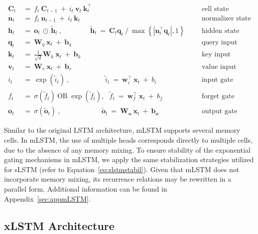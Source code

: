\begin{align}
\label{eq:mlstm_recurrent_begin}
\mathbf{C}_t \ &= \  f_t \ \mathbf{C}_{t-1} \ + \ 
  i_t \ \mathbf{v}_t \ \mathbf{k}_t^\top & &  &\text{cell state} \\
\mathbf{n}_t \ &= \  f_t \ \mathbf{n}_{t-1} \ + \ 
  i_t \ \mathbf{k}_t & &  &\text{normalizer state} \\
\mathbf{h}_t  \ &= \ \mathbf{o}_t \ \odot \ \tilde{\mathbf{h}}_t
\ , \qquad \qquad 
\tilde{\mathbf{h}}_t \ = \   \mathbf{C}_t \mathbf{q}_t \ / \ 
  \max \left\{ |\mathbf{n}_t^\top \mathbf{q}_t|, 1 \right\} 
   &&&\text{hidden state} \\
\mathbf{q}_t \ &= \ \mathbf{W}_q \ \mathbf{x}_t \ + \ \mathbf{b}_q  & &  &\text{query input} \\
\mathbf{k}_t \ &= \ \frac{1}{\sqrt{d}} \mathbf{W}_k \ \mathbf{x}_t \ + \ \mathbf{b}_k  & &  &\text{key input} \\
\mathbf{v}_t \ &= \ \mathbf{W}_v \ \mathbf{x}_t \ + \ \mathbf{b}_v  & &  &\text{value input} \\
i_t \ &= \ \!\exp \!  \! \left( \tilde{i}_t  \right) \ , 
 \qquad \qquad \ \ \ \ \,
  \tilde{i}_t \ = \ \mathbf{w}^\top_{i} \ \mathbf{x}_t \ + \  b_{i} \ \ \ 
  &&&\text{input gate} \\
f_t \ &= \ \sigma \!  \left(  \tilde{f}_t \right) \ \text{OR} \ \!\exp \!  \! \left(  \tilde{f}_t \right) , \ \ \: \!
\tilde{f}_t \ = \ \mathbf{w}^\top_{f} \ \mathbf{x}_t  \ + \
  b_{f}
  &&& \text{forget gate} \\
\label{eq:mlstm_recurrent_end}
\mathbf{o}_t \ &= \ \sigma \left( \tilde{\mathbf{o}}_t \right) \ , \qquad \qquad \quad \ \ \ \,
  \tilde{\mathbf{o}}_t  \ = \ \mathbf{W}_{\mathbf{o}} \ \mathbf{x}_t \ + \
  \mathbf{b}_{\mathbf{o}}
  &&&\text{output gate} 
\end{align}

Similar to the original LSTM architecture, mLSTM supports several memory cells. In mLSTM, the use of multiple heads corresponds directly to multiple cells, due to the absence of any memory mixing. To ensure stability of the exponential gating mechanisms in mLSTM, we apply the same stabilization strategies utilized for sLSTM (refer to Equation~\ref{eq:slstmstabil}). Given that mLSTM does not incorporate memory mixing, its recurrence relations may be rewritten in a parallel form. Additional information can be found in Appendix~\ref{sec:appmLSTM}.

\subsection{xLSTM Architecture}
\label{sec:xLSTMarch}

